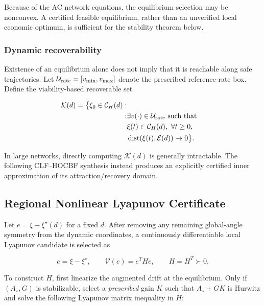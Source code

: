 \documentclass[11pt,twocolumn]{article}
\begin{document}
Because of the AC network equations, the equilibrium selection may be nonconvex. A certified feasible equilibrium, rather than an unverified local economic optimum, is sufficient for the stability theorem below.

\subsubsection{Dynamic recoverability}

Existence of an equilibrium alone does not imply that it is reachable along safe trajectories. Let $\mathcal U_{\rm rate}=[v_{\min},v_{\max}]$ denote the prescribed reference-rate box. Define the viability-based recoverable set

\begin{equation}\label{eq:kernel}
\begin{aligned}
\mathcal K(d)=\big\{\xi_0\in\mathcal C_H(d):\\;&\exists v(\cdot)\in\mathcal U_{\rm rate}\text{ such that}\\
&\xi(t)\in\mathcal C_H(d),\ \forall t\geq0,\\
&\operatorname{dist}(\xi(t),\mathcal E(d))\to0\big\}.
\end{aligned}
\end{equation}

In large networks, directly computing $\mathcal K(d)$ is generally intractable. The following CLF--HOCBF synthesis instead produces an explicitly certified inner approximation of its attraction/recovery domain.

\subsection{Regional Nonlinear Lyapunov Certificate}

\label{subsec:lyapunov}

Let $e=\xi-\xi^\star(d)$ for a fixed $d$. After removing any remaining global-angle symmetry from the dynamic coordinates, a continuously differentiable local Lyapunov candidate is selected as

\begin{equation}\label{eq:V}
e=\xi-\xi^\star,\qquad \mathcal V(e)=e^THe,\qquad H=H^T\succ0.
\end{equation}

To construct $H$, first linearize the augmented drift at the equilibrium. Only if $(A_\star,G)$ is stabilizable, select a \emph{prescribed} gain $K$ such that $A_\star+GK$ is Hurwitz and solve the following Lyapunov matrix inequality in $H$:
\end{document}
